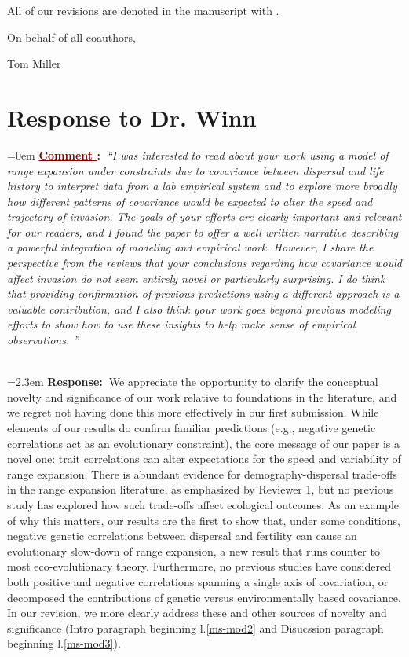 \documentclass[12pt]{article}
\newcounter{cN}
\newcommand{\comment}[1]{
	\vspace{2em}
	\refstepcounter{cN} %
	\noindent \hangindent=0em \textbf{\textcolor{Maroon}{\uline{Comment \thecN}:~}}\emph{``#1''}
	}
\newcommand{\response}[1]{
	\\[0.25em]
	\hangindent=2.3em \textbf{\textcolor{NavyBlue}{\uline{Response}:~}}#1
	}
\newcommand{\revise}[1]{{\color{Mahogany}{#1}}}
\begin{document}
All of our revisions are denoted in the manuscript with \revise{Mahogany font}.

\vspace{2em}
\hfill On behalf of all coauthors,

\hfill Tom Miller
\newpage



\section{Response to Dr. Winn}
\vspace{-2em}

\comment{I was interested to read about your work using a model of range expansion under constraints due to covariance between dispersal and life history to interpret data from a lab empirical system and to explore more broadly how different patterns of covariance would be expected to alter the speed and trajectory of invasion.
The goals of your efforts are clearly important and relevant for our readers, and I found the paper to offer a well written narrative describing a powerful integration of modeling and empirical work.
However, I share the perspective from the reviews that your conclusions regarding how covariance would affect invasion do not seem entirely novel or particularly surprising.
I do think that providing confirmation of previous predictions using a different approach is a valuable contribution, and I also think your work goes beyond previous modeling efforts to show how to use these insights to help make sense of empirical observations. }
\response{We appreciate the opportunity to clarify the conceptual novelty and significance of our work relative to foundations in the literature, and we regret not having done this more effectively in our first submission.
While elements of our results do confirm familiar predictions (e.g., negative genetic correlations act as an evolutionary constraint), the core message of our paper is a novel one: trait correlations can alter expectations for the speed and variability of range expansion.
There is abundant evidence for demography-dispersal trade-offs in the range expansion literature, as emphasized by Reviewer 1, but no previous study has explored how such trade-offs affect ecological outcomes.
As an example of why this matters, our results are the first to show that, under some conditions, negative genetic correlations between dispersal and fertility can cause an evolutionary slow-down of range expansion, a new result that runs counter to most eco-evolutionary theory.
Furthermore, no previous studies have considered both positive and negative correlations spanning a single axis of covariation, or decomposed the contributions of genetic versus environmentally based covariance.
In our revision, we more clearly address these and other sources of novelty and significance (Intro paragraph beginning l.\ref{ms-mod2} and Disucssion paragraph beginning l.\ref{ms-mod3}).}
\end{document}
